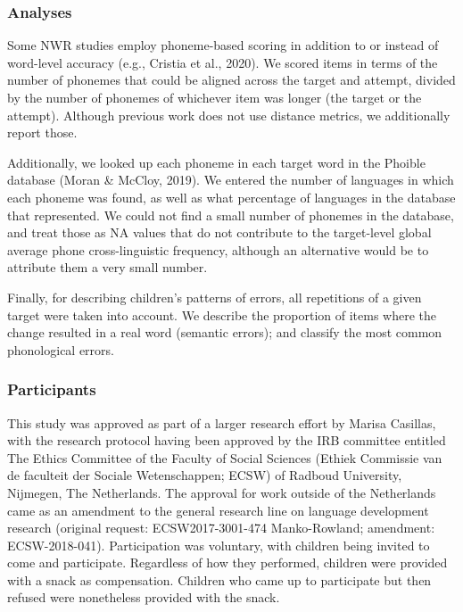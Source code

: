 \documentclass[english,,man,floatsintext]{apa6}
\begin{document}
\subsubsection{Analyses}\label{analyses}

Some NWR studies employ phoneme-based scoring in addition to or instead
of word-level accuracy (e.g., Cristia et al., 2020). We scored items in
terms of the number of phonemes that could be aligned across the target
and attempt, divided by the number of phonemes of whichever item was
longer (the target or the attempt). Although previous work does not use
distance metrics, we additionally report those.

Additionally, we looked up each phoneme in each target word in the
Phoible database (Moran \& McCloy, 2019). We entered the number of
languages in which each phoneme was found, as well as what percentage of
languages in the database that represented. We could not find a small
number of phonemes in the database, and treat those as NA values that do
not contribute to the target-level global average phone cross-linguistic
frequency, although an alternative would be to attribute them a very
small number.

Finally, for describing children's patterns of errors, all repetitions
of a given target were taken into account. We describe the proportion of
items where the change resulted in a real word (semantic errors); and
classify the most common phonological errors.

\subsubsection{Participants}\label{participants}

This study was approved as part of a larger research effort by Marisa
Casillas, with the research protocol having been approved by the IRB
committee entitled The Ethics Committee of the Faculty of Social
Sciences (Ethiek Commissie van de faculteit der Sociale Wetenschappen;
ECSW) of Radboud University, Nijmegen, The Netherlands. The approval for
work outside of the Netherlands came as an amendment to the general
research line on language development research (original request:
ECSW2017-3001-474 Manko-Rowland; amendment: ECSW-2018-041).
Participation was voluntary, with children being invited to come and
participate. Regardless of how they performed, children were provided
with a snack as compensation. Children who came up to participate but
then refused were nonetheless provided with the snack.
\end{document}
